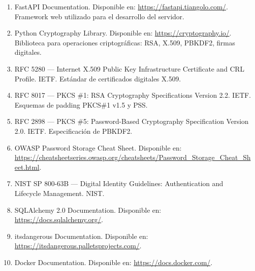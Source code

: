 \documentclass[10pt,letterpaper]{report}
\begin{document}
\begin{enumerate}[leftmargin=1cm]
  \item FastAPI Documentation. Disponible en: \url{https://fastapi.tiangolo.com/}. Framework web utilizado para el desarrollo del servidor.

  \item Python Cryptography Library. Disponible en: \url{https://cryptography.io/}. Biblioteca para operaciones criptográficas: RSA, X.509, PBKDF2, firmas digitales.

  \item RFC 5280 --- Internet X.509 Public Key Infrastructure Certificate and CRL Profile. IETF. Estándar de certificados digitales X.509.

  \item RFC 8017 --- PKCS \#1: RSA Cryptography Specifications Version 2.2. IETF. Esquemas de padding PKCS\#1 v1.5 y PSS.

  \item RFC 2898 --- PKCS \#5: Password-Based Cryptography Specification Version 2.0. IETF. Especificación de PBKDF2.

  \item OWASP Password Storage Cheat Sheet. Disponible en: \url{https://cheatsheetseries.owasp.org/cheatsheets/Password_Storage_Cheat_Sheet.html}.

  \item NIST SP 800-63B --- Digital Identity Guidelines: Authentication and Lifecycle Management. NIST.

  \item SQLAlchemy 2.0 Documentation. Disponible en: \url{https://docs.sqlalchemy.org/}.

  \item itsdangerous Documentation. Disponible en: \url{https://itsdangerous.palletsprojects.com/}.

  \item Docker Documentation. Disponible en: \url{https://docs.docker.com/}.
\end{enumerate}

\end{document}
